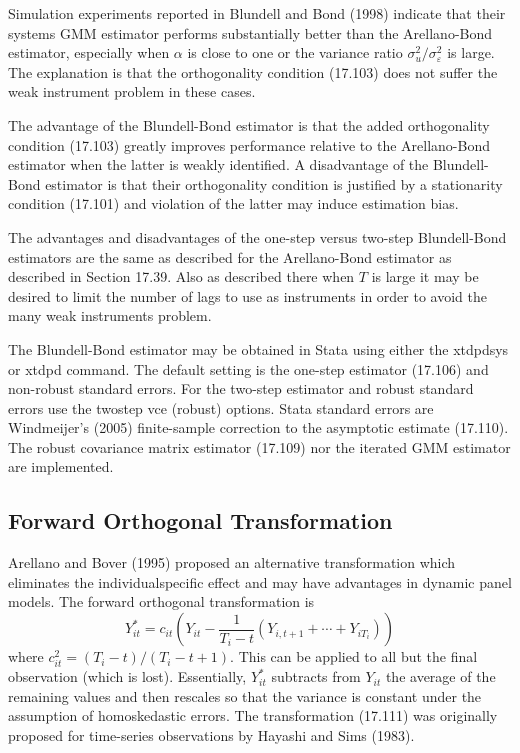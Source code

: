 \documentclass[10pt]{article}
\begin{document}
Simulation experiments reported in Blundell and Bond (1998) indicate that their systems GMM estimator performs substantially better than the Arellano-Bond estimator, especially when $\alpha$ is close to one or the variance ratio $\sigma_{u}^{2} / \sigma_{\varepsilon}^{2}$ is large. The explanation is that the orthogonality condition (17.103) does not suffer the weak instrument problem in these cases.

The advantage of the Blundell-Bond estimator is that the added orthogonality condition (17.103) greatly improves performance relative to the Arellano-Bond estimator when the latter is weakly identified. A disadvantage of the Blundell-Bond estimator is that their orthogonality condition is justified by a stationarity condition (17.101) and violation of the latter may induce estimation bias.

The advantages and disadvantages of the one-step versus two-step Blundell-Bond estimators are the same as described for the Arellano-Bond estimator as described in Section 17.39. Also as described there when $T$ is large it may be desired to limit the number of lags to use as instruments in order to avoid the many weak instruments problem.

The Blundell-Bond estimator may be obtained in Stata using either the xtdpdsys or xtdpd command. The default setting is the one-step estimator (17.106) and non-robust standard errors. For the two-step estimator and robust standard errors use the twostep vce (robust) options. Stata standard errors are Windmeijer's (2005) finite-sample correction to the asymptotic estimate (17.110). The robust covariance matrix estimator (17.109) nor the iterated GMM estimator are implemented.

\subsection{Forward Orthogonal Transformation}
Arellano and Bover (1995) proposed an alternative transformation which eliminates the individualspecific effect and may have advantages in dynamic panel models. The forward orthogonal transformation is
$$
Y_{i t}^{*}=c_{i t}\left(Y_{i t}-\frac{1}{T_{i}-t}\left(Y_{i, t+1}+\cdots+Y_{i T_{i}}\right)\right)
$$
where $c_{i t}^{2}=\left(T_{i}-t\right) /\left(T_{i}-t+1\right)$. This can be applied to all but the final observation (which is lost). Essentially, $Y_{i t}^{*}$ subtracts from $Y_{i t}$ the average of the remaining values and then rescales so that the variance is constant under the assumption of homoskedastic errors. The transformation (17.111) was originally proposed for time-series observations by Hayashi and Sims (1983).
\end{document}
